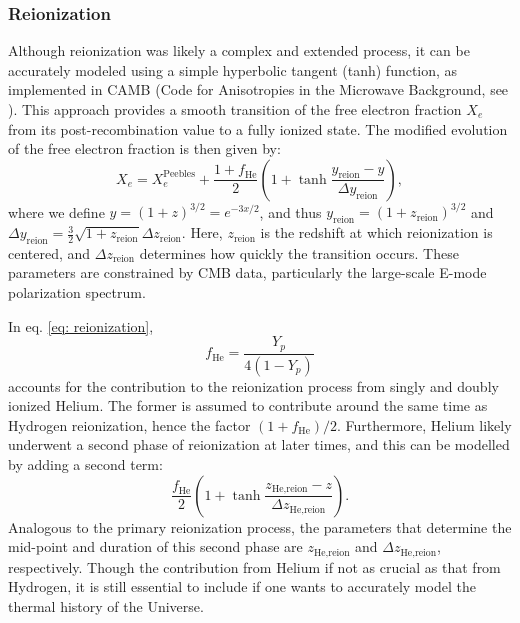 \documentclass{aa}
\numberwithin{equation}{section}
\numberwithin{table}{section}
\numberwithin{figure}{section}
\begin{document}
\subsubsection{Reionization}\label{subsubsec: II theory reionization}
Although reionization was likely a complex and extended process, it can be accurately modeled using a simple hyperbolic tangent (tanh) function, as implemented in CAMB (Code for Anisotropies in the Microwave Background, see \cite{camb2}). This approach provides a smooth transition of the free electron fraction $X_e$ from its post-recombination value to a fully ionized state. The modified evolution of the free electron fraction is then given by:
\begin{equation}
  X_e = X_e^\text{Peebles} + \frac{1 + f_{\text{He}}}{2} \left( 1 + \tanh \frac{y_{\text{reion}} - y}{\Delta y_{\text{reion}}} \right), \label{eq: reionization}
\end{equation}
where we define $y = (1+z)^{3/2} = e^{-3x/2}$, and thus $y_{\text{reion}} = (1+z_{\text{reion}})^{3/2}$ and $\Delta y_{\text{reion}} = \frac{3}{2} \sqrt{1+z_{\text{reion}}} \Delta z_{\text{reion}}$. Here, $z_{\text{reion}}$ is the redshift at which reionization is centered, and $\Delta z_{\text{reion}}$ determines how quickly the transition occurs. These parameters are constrained by CMB data, particularly the large-scale E-mode polarization spectrum. 

In eq. \eqref{eq: reionization},
\begin{equation}
  f_{\text{He}} = \frac{Y_p}{4(1-Y_p)}
\end{equation} 
accounts for the contribution to the reionization process from singly and doubly ionized Helium. The former is assumed to contribute around the same time as Hydrogen reionization, hence the factor $(1+f_\text{He})/2$. Furthermore, Helium likely underwent a second phase of reionization at later times, and this can be modelled by adding a second term:
\begin{equation}
  \frac{f_{\text{He}}}{2} \left( 1 + \tanh \frac{z_{\text{He,reion}} - z}{\Delta z_{\text{He,reion}}}\right).
\end{equation}
Analogous to the primary reionization process, the parameters that determine the mid-point and duration of this second phase are $z_\text{He,reion}$ and $\Delta z_\text{He,reion}$, respectively. Though the contribution from Helium if not as crucial as that from Hydrogen, it is still essential to include if one wants to accurately model the thermal history of the Universe.
\end{document}

